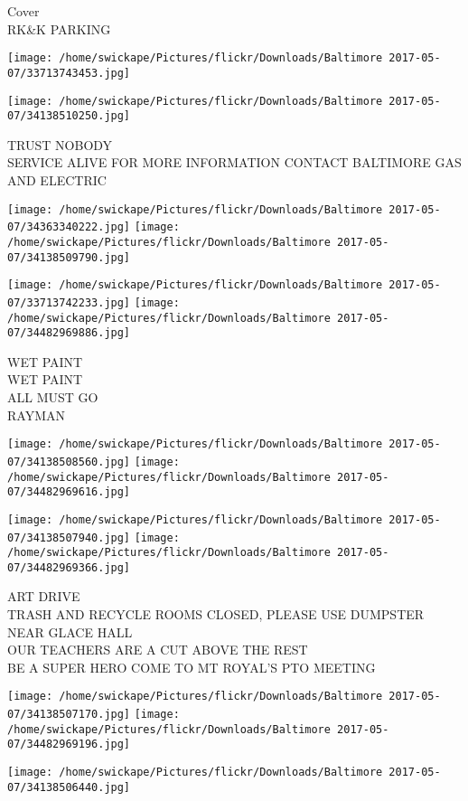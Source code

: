 \documentclass[10pt,letterpaper]{article}
\begin{document}
Cover\\
RK\&K PARKING
\pagebreak

\texttt{[image: /home/swickape/Pictures/flickr/Downloads/Baltimore 2017-05-07/33713743453.jpg]}

\vspace{0.25in}
\texttt{[image: /home/swickape/Pictures/flickr/Downloads/Baltimore 2017-05-07/34138510250.jpg]}

TRUST NOBODY\\
SERVICE ALIVE FOR MORE INFORMATION CONTACT BALTIMORE GAS AND ELECTRIC
\pagebreak

\texttt{[image: /home/swickape/Pictures/flickr/Downloads/Baltimore 2017-05-07/34363340222.jpg]}
\texttt{[image: /home/swickape/Pictures/flickr/Downloads/Baltimore 2017-05-07/34138509790.jpg]}

\texttt{[image: /home/swickape/Pictures/flickr/Downloads/Baltimore 2017-05-07/33713742233.jpg]}
\texttt{[image: /home/swickape/Pictures/flickr/Downloads/Baltimore 2017-05-07/34482969886.jpg]}

WET PAINT\\
WET PAINT\\
ALL MUST GO\\
RAYMAN
\pagebreak

\texttt{[image: /home/swickape/Pictures/flickr/Downloads/Baltimore 2017-05-07/34138508560.jpg]}
\texttt{[image: /home/swickape/Pictures/flickr/Downloads/Baltimore 2017-05-07/34482969616.jpg]}

\texttt{[image: /home/swickape/Pictures/flickr/Downloads/Baltimore 2017-05-07/34138507940.jpg]}
\texttt{[image: /home/swickape/Pictures/flickr/Downloads/Baltimore 2017-05-07/34482969366.jpg]}

ART DRIVE\\
TRASH AND RECYCLE ROOMS CLOSED, PLEASE USE DUMPSTER NEAR GLACE HALL\\
OUR TEACHERS ARE A CUT ABOVE THE REST\\
BE A SUPER HERO COME TO MT ROYAL'S PTO MEETING
\pagebreak

\texttt{[image: /home/swickape/Pictures/flickr/Downloads/Baltimore 2017-05-07/34138507170.jpg]}
\texttt{[image: /home/swickape/Pictures/flickr/Downloads/Baltimore 2017-05-07/34482969196.jpg]}

\texttt{[image: /home/swickape/Pictures/flickr/Downloads/Baltimore 2017-05-07/34138506440.jpg]}
\end{document}
